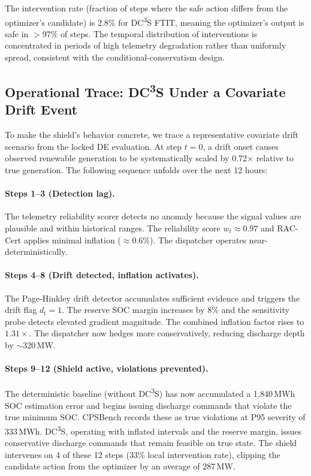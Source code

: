 \documentclass[11pt,a4paper]{article}
\begin{document}
The intervention rate (fraction of steps where the safe action differs from the optimizer's candidate) is 2.8\% for DC\textsuperscript{3}S FTIT, meaning the optimizer's output is safe in $>$97\% of steps. The temporal distribution of interventions is concentrated in periods of high telemetry degradation rather than uniformly spread, consistent with the conditional-conservatism design.

\subsection{Operational Trace: DC\textsuperscript{3}S Under a Covariate Drift Event}\label{sec:operational_trace}

To make the shield's behavior concrete, we trace a representative covariate drift scenario from the locked DE evaluation. At step $t = 0$, a drift onset causes observed renewable generation to be systematically scaled by 0.72$\times$ relative to true generation. The following sequence unfolds over the next 12 hours:

\paragraph{Steps 1--3 (Detection lag).} The telemetry reliability scorer detects no anomaly because the signal values are plausible and within historical ranges. The reliability score $w_t \approx 0.97$ and RAC-Cert applies minimal inflation ($\approx 0.6\%$). The dispatcher operates near-deterministically.

\paragraph{Steps 4--8 (Drift detected, inflation activates).} The Page-Hinkley drift detector accumulates sufficient evidence and triggers the drift flag $d_t = 1$. The reserve SOC margin increases by 8\% and the sensitivity probe detects elevated gradient magnitude. The combined inflation factor rises to $1.31\times$. The dispatcher now hedges more conservatively, reducing discharge depth by $\sim$320\,MW.

\paragraph{Steps 9--12 (Shield active, violations prevented).} The deterministic baseline (without DC\textsuperscript{3}S) has now accumulated a 1,840\,MWh SOC estimation error and begins issuing discharge commands that violate the true minimum SOC. CPSBench records these as true violations at P95 severity of 333\,MWh. DC\textsuperscript{3}S, operating with inflated intervals and the reserve margin, issues conservative discharge commands that remain feasible on true state. The shield intervenes on 4 of these 12 steps (33\% local intervention rate), clipping the candidate action from the optimizer by an average of 287\,MW.
\end{document}
